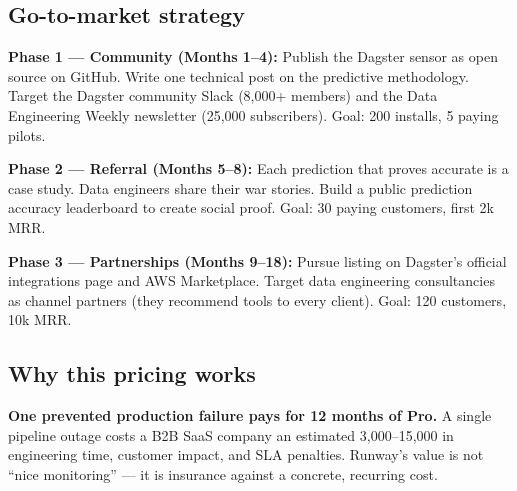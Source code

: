 \vspace{6pt}

\subsection{Go-to-market strategy}

\textbf{Phase 1 — Community (Months 1--4):}
Publish the Dagster sensor as open source on GitHub. Write one technical post on the
predictive methodology. Target the Dagster community Slack (8,000+ members) and the
Data Engineering Weekly newsletter (25,000 subscribers).
Goal: 200 installs, 5 paying pilots.

\vspace{4pt}

\textbf{Phase 2 — Referral (Months 5--8):}
Each prediction that proves accurate is a case study. Data engineers share their war stories.
Build a public prediction accuracy leaderboard to create social proof.
Goal: 30 paying customers, first \texteuro{}2k MRR.

\vspace{4pt}

\textbf{Phase 3 — Partnerships (Months 9--18):}
Pursue listing on Dagster's official integrations page and AWS Marketplace.
Target data engineering consultancies as channel partners (they recommend tools to every client).
Goal: 120 customers, \texteuro{}10k MRR.

\subsection{Why this pricing works}

\begin{insight}
\textbf{One prevented production failure pays for 12 months of Pro.}
A single pipeline outage costs a B2B SaaS company an estimated \texteuro{}3,000--15,000
in engineering time, customer impact, and SLA penalties. Runway's value is not
``nice monitoring'' — it is insurance against a concrete, recurring cost.
\end{insight}
